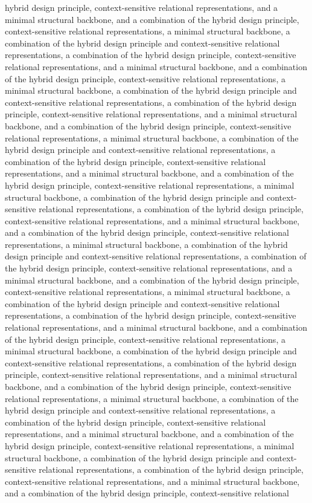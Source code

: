 hybrid design principle, context-sensitive relational representations, and a minimal structural backbone, and a combination of the hybrid design principle, context-sensitive relational representations, a minimal structural backbone, a combination of the hybrid design principle and context-sensitive relational representations, a combination of the hybrid design principle, context-sensitive relational representations, and a minimal structural backbone, and a combination of the hybrid design principle, context-sensitive relational representations, a minimal structural backbone, a combination of the hybrid design principle and context-sensitive relational representations, a combination of the hybrid design principle, context-sensitive relational representations, and a minimal structural backbone, and a combination of the hybrid design principle, context-sensitive relational representations, a minimal structural backbone, a combination of the hybrid design principle and context-sensitive relational representations, a combination of the hybrid design principle, context-sensitive relational representations, and a minimal structural backbone, and a combination of the hybrid design principle, context-sensitive relational representations, a minimal structural backbone, a combination of the hybrid design principle and context-sensitive relational representations, a combination of the hybrid design principle, context-sensitive relational representations, and a minimal structural backbone, and a combination of the hybrid design principle, context-sensitive relational representations, a minimal structural backbone, a combination of the hybrid design principle and context-sensitive relational representations, a combination of the hybrid design principle, context-sensitive relational representations, and a minimal structural backbone, and a combination of the hybrid design principle, context-sensitive relational representations, a minimal structural backbone, a combination of the hybrid design principle and context-sensitive relational representations, a combination of the hybrid design principle, context-sensitive relational representations, and a minimal structural backbone, and a combination of the hybrid design principle, context-sensitive relational representations, a minimal structural backbone, a combination of the hybrid design principle and context-sensitive relational representations, a combination of the hybrid design principle, context-sensitive relational representations, and a minimal structural backbone, and a combination of the hybrid design principle, context-sensitive relational representations, a minimal structural backbone, a combination of the hybrid design principle and context-sensitive relational representations, a combination of the hybrid design principle, context-sensitive relational representations, and a minimal structural backbone, and a combination of the hybrid design principle, context-sensitive relational representations, a minimal structural backbone, a combination of the hybrid design principle and context-sensitive relational representations, a combination of the hybrid design principle, context-sensitive relational representations, and a minimal structural backbone, and a combination of the hybrid design principle, context-sensitive relational 